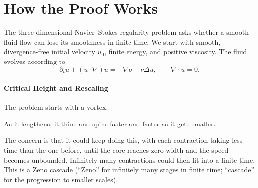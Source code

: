 \begingroup
\setlength{\parindent}{0pt}
\setlength{\parskip}{0.5\baselineskip}
\setlength{\abovedisplayskip}{8pt}
\setlength{\belowdisplayskip}{8pt}
\setlength{\abovedisplayshortskip}{8pt}
\setlength{\belowdisplayshortskip}{8pt}
\setlength{\jot}{5pt}

\part{How the Proof Works}
\label{u:guide:how-proof-works}

The three-dimensional Navier--Stokes regularity problem asks whether a smooth fluid flow can lose its smoothness in finite time. We start with smooth, divergence-free initial velocity \(u_0\), finite energy, and positive viscosity. The fluid evolves according to
\[
\partial_tu+(u\cdot\nabla)u=-\nabla p+\nu\Delta u,
\qquad \nabla\cdot u=0.
\]

\subsection*{Critical Height and Rescaling}

The problem starts with a vortex.

As it lengthens, it thins and spins faster and faster as it gets smaller.

The concern is that it could keep doing this, with each contraction taking
less time than the one before, until the core reaches zero width and the
speed becomes unbounded. Infinitely many contractions could then fit into
a finite time.
This is a Zeno cascade (``Zeno'' for infinitely many stages in finite time;
``cascade'' for the progression to smaller scales).

